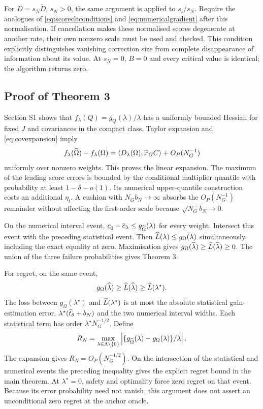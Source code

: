 For $D=s_N\widetilde D$, $s_N>0$, the same argument is applied to $s_i/s_N$. Require the analogues of \eqref{eq:scorecltconditions} and \eqref{eq:numericalgradient} after this normalisation. If cancellation makes these normalised scores degenerate at another rate, their own nonzero scale must be used and checked. This condition explicitly distinguishes vanishing correction size from complete disappearance of information about its value. At $s_N=0$, $B=0$ and every critical value is identical; the algorithm returns zero.

\subsection{Proof of Theorem 3}
Section S1 shows that $f_\lambda(Q)=g_Q(\lambda)/\lambda$ has a uniformly bounded Hessian for fixed $J$ and covariances in the compact class. Taylor expansion and \eqref{eq:covexpansion} imply
\[
 f_\lambda(\widehat\Omega)-f_\lambda(\Omega)
 =\langle D_\lambda(\Omega),\mathbb P_G C\rangle+O_P(N_G^{-1})
\]
uniformly over nonzero weights. This proves the linear expansion. The maximum of the leading score errors is bounded by the conditional multiplier quantile with probability at least $1-\delta-o(1)$. Its numerical upper-quantile construction costs an additional $\eta_t$. A cushion with $N_Gb_N\to\infty$ absorbs the $O_P(N_G^{-1})$ remainder without affecting the first-order scale because $\sqrt{N_G}b_N\to0$.

On the numerical interval event, $\underline c_0-\overline c_\lambda\leq g_{\widehat\Omega}(\lambda)$ for every weight. Intersect this event with the preceding statistical event. Then $\widehat L(\lambda)\leq g_\Omega(\lambda)$ simultaneously, including the exact equality at zero. Maximisation gives $g_\Omega(\widehat\lambda)\geq\widehat L(\widehat\lambda)\geq0$. The union of the three failure probabilities gives Theorem 3.

For regret, on the same event,
\[
 g_\Omega(\widehat\lambda)\geq\widehat L(\widehat\lambda)\geq\widehat L(\lambda^\star).
\]
The loss between $g_\Omega(\lambda^\star)$ and $\widehat L(\lambda^\star)$ is at most the absolute statistical gain-estimation error, $\lambda^\star(\widehat t_\delta+b_N)$ and the two numerical interval widths. Each statistical term has order $\lambda^\star N_G^{-1/2}$. Define
\[
 R_N=\max_{\lambda\in\Lambda\setminus\{0\}}
 \left|\{g_{\widehat\Omega}(\lambda)-g_\Omega(\lambda)\}/\lambda\right|.
\]
The expansion gives $R_N=O_P(N_G^{-1/2})$. On the intersection of the statistical and numerical events the preceding inequality gives the explicit regret bound in the main theorem. At $\lambda^\star=0$, safety and optimality force zero regret on that event. Because its error probability need not vanish, this argument does not assert an unconditional zero regret at the anchor oracle.

